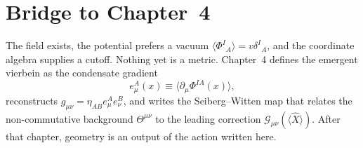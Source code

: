 \section{Bridge to Chapter~4}
\label{sec:ch3-bridge}

The field exists, the potential prefers a vacuum
\(\langle\Phi^I{}_A\rangle=v\delta^I{}_A\), and the coordinate algebra
supplies a cutoff. Nothing yet is a metric. Chapter~4 defines the
emergent vierbein as the condensate gradient
\begin{equation}
  \label{eq:vierbein-next}
  e^A_\mu(x)\equiv\langle\partial_\mu\Phi^{IA}(x)\rangle,
\end{equation}
reconstructs \(g_{\mu\nu}=\eta_{AB}e^A_\mu e^B_\nu\), and writes the
Seiberg--Witten map that relates the non-commutative background
\(\Theta^{\mu\nu}\) to the leading correction
\(\mathcal{G}_{\mu\nu}(\langle\hat X\rangle)\). After that chapter,
geometry is an output of the action written here.